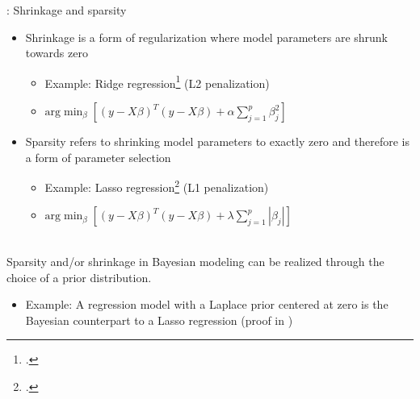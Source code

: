 \begin{frame}{: Shrinkage and sparsity}
    \begin{itemize}
        \item Shrinkage is a form of regularization where model parameters are shrunk towards zero
              \begin{itemize}
                  \item Example: Ridge regression\footcite{hoerl_ridge_2000} (L2 penalization)
                  \item $\text{arg} \min_{\beta} \left[ (y - X\beta)^T (y - X\beta) + \alpha \sum_{j = 1}^{p}\beta_j^2 \right]$
              \end{itemize}
        \item Sparsity refers to shrinking model parameters to exactly zero and therefore is a form of parameter selection
              \begin{itemize}
                  \item Example: Lasso regression\footcite{tibshirani_regression_1996} (L1 penalization)
                  \item $\text{arg} \min_{\beta} \left[ (y - X\beta)^T (y - X\beta) + \lambda \sum_{j = 1}^{p}|\beta_j| \right]$
              \end{itemize}
    \end{itemize}~\\
    
    Sparsity and/or shrinkage in Bayesian modeling can be realized through the choice of a prior distribution.
    \begin{itemize}
        \item Example: A regression model with a Laplace prior centered at zero is the Bayesian counterpart to a Lasso regression (proof in )
    \end{itemize}
\end{frame}

